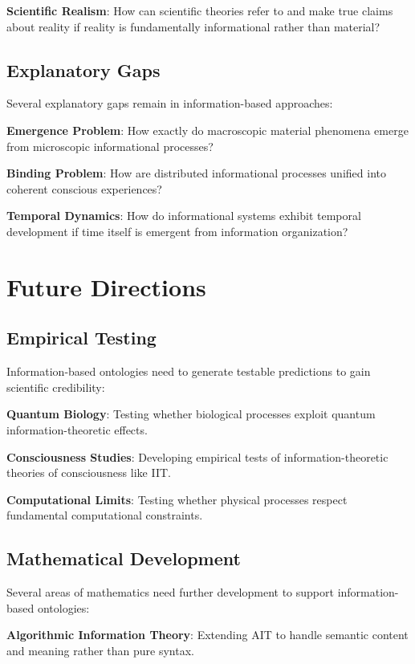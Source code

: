 \documentclass[12pt]{article}
\begin{document}
\textbf{Scientific Realism}: How can scientific theories refer to and make true claims about reality if reality is fundamentally informational rather than material?

\subsection{Explanatory Gaps}

Several explanatory gaps remain in information-based approaches:

\textbf{Emergence Problem}: How exactly do macroscopic material phenomena emerge from microscopic informational processes?

\textbf{Binding Problem}: How are distributed informational processes unified into coherent conscious experiences?

\textbf{Temporal Dynamics}: How do informational systems exhibit temporal development if time itself is emergent from information organization?

\section{Future Directions}

\subsection{Empirical Testing}

Information-based ontologies need to generate testable predictions to gain scientific credibility:

\textbf{Quantum Biology}: Testing whether biological processes exploit quantum information-theoretic effects.

\textbf{Consciousness Studies}: Developing empirical tests of information-theoretic theories of consciousness like IIT.

\textbf{Computational Limits}: Testing whether physical processes respect fundamental computational constraints.

\subsection{Mathematical Development}

Several areas of mathematics need further development to support information-based ontologies:

\textbf{Algorithmic Information Theory}: Extending AIT to handle semantic content and meaning rather than pure syntax.
\end{document}
